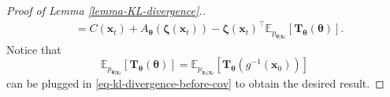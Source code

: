 \begin{proof}[Proof of Lemma \ref{lemma-KL-divergence}.]
\begin{equation}
\begin{aligned}
    &= C(\mathbf{x}_t) +  A_{\boldsymbol{\theta}}(\boldsymbol{\zeta}(\mathbf{x}_t)) -  \boldsymbol{\zeta}(\mathbf{x}_t)^\top \mathbb{E}_{p_{\boldsymbol{\theta}|\mathbf{x}_t}}[ \mathbf{T}_{\boldsymbol{\theta}}(\boldsymbol{\theta})].
\end{aligned}
\end{equation}
Notice that
\begin{equation*}
\mathbb{E}_{p_{\boldsymbol{\theta}|\mathbf{x}_t}}[ \mathbf{T}_{\boldsymbol{\theta}}(\boldsymbol{\theta})] = \mathbb{E}_{p_{\mathbf{x}_{0}|\mathbf{x}_t}}[ \mathbf{T}_{\boldsymbol{\theta}}(g^{-1}(\mathbf{x}_{0}))]
\end{equation*}
can be plugged in \eqref{eq-kl-divergence-before-cov} to obtain the desired result.
\end{proof}